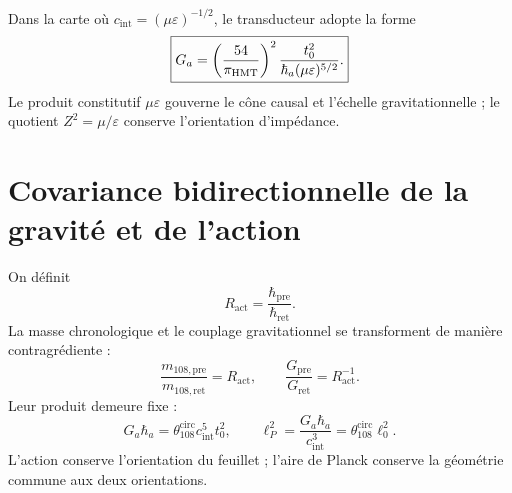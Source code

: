 Dans la carte où \(c_{\mathrm{int}}=(\mu\varepsilon)^{-1/2}\), le
transducteur adopte la forme
\begin{equation}
 \boxed{
 G_a=\left(\frac{54}{\pi_{\rm HMT}}\right)^2
 \frac{t_0^2}{\hbar_a(\mu\varepsilon)^{5/2}}.}
 \label{eq:l9s102:g-mu-epsilon}
\end{equation}
Le produit constitutif \(\mu\varepsilon\) gouverne le cône causal et
l'échelle gravitationnelle ; le quotient \(Z^2=\mu/\varepsilon\) conserve
l'orientation d'impédance.

\section{Covariance bidirectionnelle de la gravité et de l'action}
\label{sec:l9s102:g-hbar}

On définit
\begin{equation}
 R_{\mathrm{act}}=\frac{\hbar_{\mathrm{pre}}}
 {\hbar_{\mathrm{ret}}}.
 \label{eq:l9s102:r-act}
\end{equation}
La masse chronologique et le couplage gravitationnel se transforment
de manière contragrédiente :
\begin{equation}
 \frac{m_{108,\mathrm{pre}}}{m_{108,\mathrm{ret}}}=R_{\mathrm{act}},
 \qquad
 \frac{G_{\mathrm{pre}}}{G_{\mathrm{ret}}}=R_{\mathrm{act}}^{-1}.
 \label{eq:l9s102:g-hbar-reciprocidad}
\end{equation}
Leur produit demeure fixe :
\begin{equation}
 \boxed{
 G_a\hbar_a
 =\theta_{108}^{\mathrm{circ}}c_{\mathrm{int}}^5t_0^2,
 \qquad
 \ell_P^2=\frac{G_a\hbar_a}{c_{\mathrm{int}}^3}
 =\theta_{108}^{\mathrm{circ}}\ell_0^2.}
 \label{eq:l9s102:g-hbar-invariante}
\end{equation}
L'action conserve l'orientation du feuillet ; l'aire de Planck conserve la
géométrie commune aux deux orientations.

